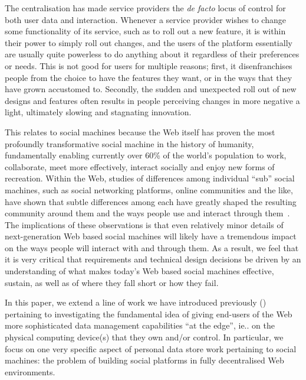 \documentclass{sig-alternate}
\begin{document}
The centralisation has made service providers the \emph{de facto} locus of control for both user data and interaction.  Whenever a service provider wishes to change some functionality of its service, such as to roll out a new feature, it is within their power to simply roll out changes, and the users of the platform essentially are usually quite powerless to do anything about it regardless of their preferences or needs.  This is not good for users for multiple reasons; first, it disenfranchises people from the choice to have the features they want, or in the ways that they have grown accustomed to. Secondly, the sudden and unexpected roll out of new designs and features often results in people perceiving changes in more negative a light, ultimately slowing and stagnating innovation.


This relates to social machines because the Web itself has proven the most profoundly transformative social machine in the history of humanity, fundamentally enabling currently over 60\% of the world's population to work, collaborate, meet more effectively, interact socially and enjoy new forms of recreation.  Within the Web, studies of differences among individual ``sub'' social machines, such as social networking platforms, online communities and the like, have shown that subtle differences among  each have greatly shaped the resulting community around them and the ways people use and interact through them~\cite{ross2010person}.  The implications of these observations is that even relatively minor details of next-generation Web based social machines will likely have a tremendous impact on the ways people will interact with and through them.  As a result, we feel that it is very critical that requirements and technical design decisions be driven by an understanding of what makes today's Web based social machines effective, sustain, as well as of where they fall short or how they fail.

In this paper, we extend a line of work we have introduced previously (\cite{van20147,van2014future,van2012decentralized})  pertaining to investigating the fundamental idea of giving end-users of the Web more sophisticated data management capabilities ``at the edge'', ie.. on the physical computing device(s) that they own and/or control.  In particular, we focus on one very specific aspect of personal data store work pertaining to social machines: the problem of building social platforms in fully decentralised Web environments.   
\end{document}
